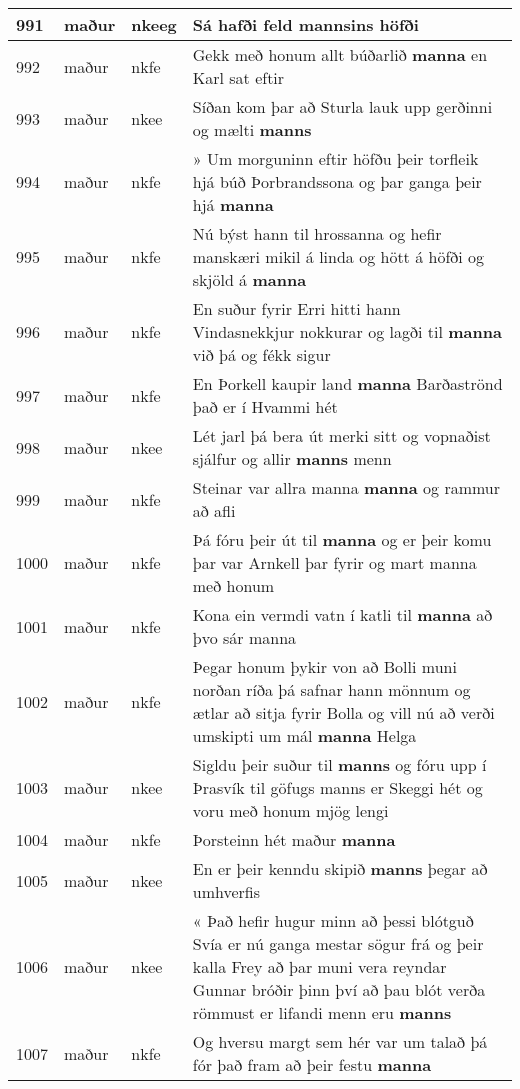 \documentclass{article}
\begin{document}
\begin{longtable}{p{1cm}|p{1cm}|p{1cm}|p{13cm}}
\hline
991&maður&nkeeg&Sá hafði feld \textbf{mannsins} höfði\\
\hline
992&maður&nkfe&Gekk með honum allt búðarlið \textbf{manna} en Karl sat eftir\\
\hline
993&maður&nkee&Síðan kom þar að Sturla lauk upp gerðinni og mælti \textbf{manns} \\
\hline
994&maður&nkfe&» Um morguninn eftir höfðu þeir torfleik hjá búð Þorbrandssona og þar ganga þeir hjá \textbf{manna} \\
\hline
995&maður&nkfe&Nú býst hann til hrossanna og hefir manskæri mikil á linda og hött á höfði og skjöld á \textbf{manna} \\
\hline
996&maður&nkfe&En suður fyrir Erri hitti hann Vindasnekkjur nokkurar og lagði til \textbf{manna} við þá og fékk sigur\\
\hline
997&maður&nkfe&En Þorkell kaupir land \textbf{manna} Barðaströnd það er í Hvammi hét\\
\hline
998&maður&nkee&Lét jarl þá bera út merki sitt og vopnaðist sjálfur og allir \textbf{manns} menn\\
\hline
999&maður&nkfe&Steinar var allra manna \textbf{manna} og rammur að afli\\
\hline
1000&maður&nkfe&Þá fóru þeir út til \textbf{manna} og er þeir komu þar var Arnkell þar fyrir og mart manna með honum\\
\hline
1001&maður&nkfe&Kona ein vermdi vatn í katli til \textbf{manna} að þvo sár manna\\
\hline
1002&maður&nkfe&Þegar honum þykir von að Bolli muni norðan ríða þá safnar hann mönnum og ætlar að sitja fyrir Bolla og vill nú að verði umskipti um mál \textbf{manna} Helga\\
\hline
1003&maður&nkee&Sigldu þeir suður til \textbf{manns} og fóru upp í Þrasvík til göfugs manns er Skeggi hét og voru með honum mjög lengi\\
\hline
1004&maður&nkfe&Þorsteinn hét maður \textbf{manna} \\
\hline
1005&maður&nkee&En er þeir kenndu skipið \textbf{manns} þegar að umhverfis\\
\hline
1006&maður&nkee&« Það hefir hugur minn að þessi blótguð Svía er nú ganga mestar sögur frá og þeir kalla Frey að þar muni vera reyndar Gunnar bróðir þinn því að þau blót verða römmust er lifandi menn eru \textbf{manns} \\
\hline
1007&maður&nkfe&Og hversu margt sem hér var um talað þá fór það fram að þeir festu \textbf{manna} \\

\end{longtable}
\end{document}
